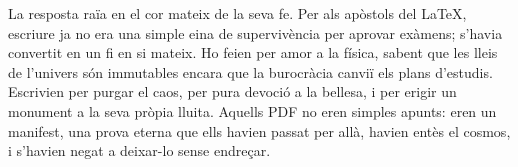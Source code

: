 La resposta raïa en el cor mateix de la seva fe. Per als apòstols del LaTeX, escriure ja no era una simple eina de supervivència per aprovar exàmens; s'havia convertit en un fi en si mateix. Ho feien per amor a la física, sabent que les lleis de l'univers són immutables encara que la burocràcia canviï els plans d'estudis. Escrivien per purgar el caos, per pura devoció a la bellesa, i per erigir un monument a la seva pròpia lluita. Aquells PDF no eren simples apunts: eren un manifest, una prova eterna que ells havien passat per allà, havien entès el cosmos, i s'havien negat a deixar-lo sense endreçar.




















